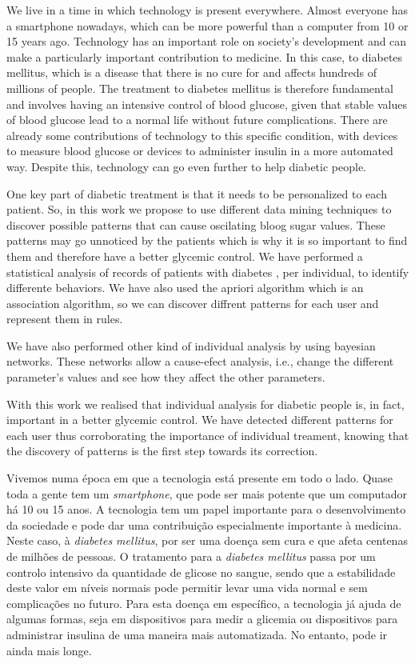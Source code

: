 


We live in a time in which technology is present everywhere. Almost everyone has a smartphone nowadays, which can be more powerful than a computer from 10 or 15 years ago. Technology has an important role on society's development and can make a particularly important contribution to medicine. In this case, to diabetes mellitus, which is a disease that there is no cure for and affects hundreds of millions of people. The treatment to diabetes mellitus is therefore fundamental and involves having an intensive control of blood glucose, given that stable values of blood glucose lead to a normal life without future complications. There are already some contributions of technology to this specific condition, with devices to measure blood glucose or devices to administer insulin in a more automated way. Despite this, technology can go even further to help diabetic people.

One key part of diabetic treatment is that it needs to be personalized to each patient. So, in this work we propose to use different data mining techniques to discover possible patterns that can cause oscilating bloog sugar values. These patterns may go unnoticed by the patients which is why it is so important to find them and therefore have a better glycemic control. We have performed a statistical analysis of records of patients with diabetes , per individual, to identify differente behaviors.	
We have also used the apriori algorithm which is an association algorithm, so we can discover diffrent patterns for each user and represent them in rules.

We have also performed other kind of individual analysis by using bayesian networks. These networks allow a cause-efect analysis, i.e., change the different parameter's values and see how they affect the other parameters.

With this work  we realised that individual analysis for diabetic people is, in fact, important in a better glycemic control. We have detected different patterns for each user thus corroborating the importance of individual treament, knowing that the discovery of patterns is the first step towards its correction.


Vivemos numa época em que a tecnologia está presente em todo o lado. Quase toda a gente tem um \textit{smartphone}, que pode ser mais potente que um computador há 10 ou 15 anos. A tecnologia tem um papel importante para o desenvolvimento da sociedade e pode dar uma contribuição especialmente importante à medicina. Neste caso, à \textit{diabetes mellitus}, por ser uma doença sem cura e que afeta centenas de milhões de pessoas. O tratamento para a \textit{diabetes mellitus} passa por um controlo intensivo da quantidade de glicose no sangue, sendo que a estabilidade deste valor em níveis normais pode permitir levar uma vida normal e sem complicações no futuro. Para esta doença em específico, a tecnologia já ajuda de algumas formas, seja em dispositivos para medir a glicemia ou dispositivos para administrar insulina de uma maneira mais automatizada. No entanto, pode ir ainda mais longe.

